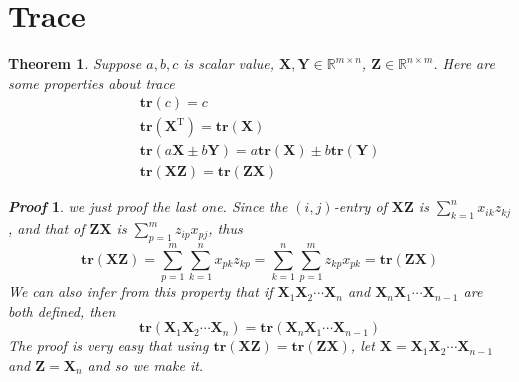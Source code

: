 \documentclass{article}
\newcommand{\Transpose}{\ensuremath{\mathrm{T}}}
\newcommand{\Trace}{\ensuremath{\mathbf{tr}}}
\newcommand{\MatrixSymbol}[1]{\ensuremath{{\boldsymbol{#1}}}}
\newcommand{\MatrixX}{\MatrixSymbol{X}}
\newcommand{\MatrixY}{\MatrixSymbol{Y}}
\newcommand{\MatrixZ}{\MatrixSymbol{Z}}
\newtheorem{Theorem}{Theorem}[section]
\theoremstyle{nonumberplain}
\newtheorem{Proof}{\textit{\textbf{Proof}}}
\begin{document}
\section{Trace}
\begin{Theorem}
    Suppose $a,b,c$ is scalar value, $\MatrixX,\MatrixY\in\mathbb{R}^{m\times n}$, $\MatrixZ\in\mathbb{R}^{n\times m}$. Here are some properties about trace
    \begin{gather}
        \Trace(c)=c\\
        \Trace(\MatrixX^\Transpose)=\Trace(\MatrixX)\\
        \Trace(a\MatrixX\pm b\MatrixY)=a\Trace(\MatrixX)\pm b\Trace(\MatrixY)\\
        \Trace(\MatrixX\MatrixZ)=\Trace(\MatrixZ\MatrixX)
    \end{gather}
\end{Theorem}
\begin{Proof}
    we just proof the last one. Since the $(i,j)$-entry of $\MatrixX\MatrixZ$ is $\sum_{k=1}^{n}x_{ik}z_{kj}$, and that of $\MatrixZ\MatrixX$ is $\sum_{p=1}^{m}z_{ip}x_{pj}$, thus 
    \begin{equation*}
        \Trace(\MatrixX\MatrixZ)=\sum_{p=1}^m \sum_{k=1}^{n} x_{pk}z_{kp}=\sum_{k=1}^{n}\sum_{p=1}^m z_{kp}x_{pk}=\Trace(\MatrixZ\MatrixX)
    \end{equation*}
    We can also infer from this property that if $\MatrixX_1\MatrixX_2\cdots\MatrixX_n$ and $\MatrixX_n\MatrixX_1\cdots\MatrixX_{n-1}$ are both defined, then
    \begin{equation}
        \Trace(\MatrixX_1\MatrixX_2\cdots\MatrixX_n)=\Trace(\MatrixX_n\MatrixX_1\cdots\MatrixX_{n-1})
    \end{equation} 
    The proof is very easy that using $\Trace(\MatrixX\MatrixZ)=\Trace(\MatrixZ\MatrixX)$, let $\MatrixX=\MatrixX_1\MatrixX_2\cdots\MatrixX_{n-1}$ and $\MatrixZ=\MatrixX_n$ and so we make it.
\end{Proof}
\end{document}
